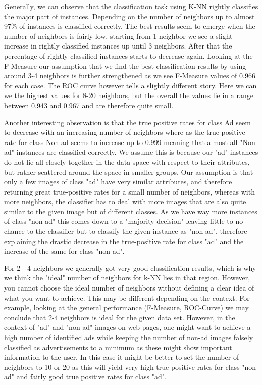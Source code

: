 \documentclass{sig-alternate-05-2015}
\begin{document}
{Generally, we can observe that the classification task using K-NN rightly classifies the major part of instances. Depending on the number of neighbors up to almost 97\% of instances is classified correctly. The best results seem to emerge when the number of neighbors is fairly low, starting from 1 neighbor we see a slight increase in rightly classified instances up until 3 neighbors. After that the percentage of rightly classified instances starts to decrease again. Looking at the F-Measure our assumption that we find the best classification results by using around 3-4 neighbors is further strengthened as we see F-Measure values of 0.966 for each case. The ROC curve however tells a slightly different story. Here we can we the highest values for 8-20 neighbors, but the overall the values lie in a range between 0.943 and 0.967 and are therefore quite small.

Another interesting observation is that the true positive rates for class Ad seem to decrease with an increasing number of neighbors where as the true positive rate for class Non-ad seems to increase up to 0.999 meaning that almost all "Non-ad" instances are classified correctly. We assume this is because our "ad" instances do not lie all closely together in the data space with respect to their attributes, but rather scattered around the space in smaller groups. Our assumption is that only a few images of class "ad" have very similar attributes, and therefore returning great true-positive rates for a small number of neighbors, whereas with more neighbors, the classifier has to deal with more images that are also quite similar to the given image but of different classes. As we have way more instances of class "non-ad" this comes down to a "majority decision" leaving little to no chance to the classifier but to classify the given instance as "non-ad", therefore explaining the drastic decrease in the true-positive rate for class "ad" and the increase of the same for class "non-ad".

For 2 - 4 neighbors we generally got very good classification results, which is why we think the "ideal" number of neighbors for k-NN lies in that region. However, you cannot choose the ideal number of neighbors without defining a clear idea of what you want to achieve. This may be different depending on the context. For example, looking at the general performance (F-Measure, ROC-Curve) we may conclude that 2-4 neighbors is ideal for the given data set. However, in the context of "ad" and "non-ad" images on web pages, one might want to achieve a high number of identified ads while keeping the number of non-ad images falsely classified  as advertisements to a minimum as these might show important information to the user. In this case it might be better to set the number of neighbors to 10 or 20 as this will yield very high true positive rates for class "non-ad" and fairly good true positive rates for class "ad". 

}
\end{document}
